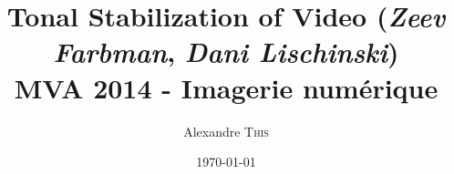 \documentclass{article}
\title{Tonal Stabilization of Video (\textit{Zeev Farbman}, \textit{Dani Lischinski})\\MVA 2014 - Imagerie numérique} %
\author{Alexandre \textsc{This}} %
\date{\today} %
\begin{document}
\maketitle %



\setlength\parindent{0pt} %

\renewcommand{\labelenumi}{\alph{enumi}.} %

\tableofcontents

\newpage




\appendix

\newpage


\end{document}

